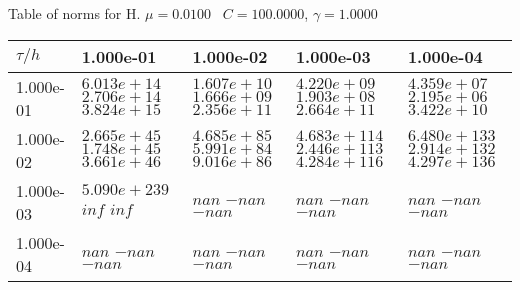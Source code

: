 \begin{center}
Table of norms for H. $\mu = 0.0100$ \, $C = 100.0000$, $\gamma = 1.0000$
  
\begin{tabular}{|p{1in}|p{1in}|p{1in}|p{1in}|p{1in}|} \hline
$\tau / h$ &1.000e-01 &1.000e-02 &1.000e-03 &1.000e-04 \\ \hline 
1.000e-01 & $6.013e+14$  $2.706e+14$  $3.824e+15$  & $1.607e+10$  $1.666e+09$  $2.356e+11$  & $4.220e+09$  $1.903e+08$  $2.664e+11$  & $4.359e+07$  $2.195e+06$  $3.422e+10$  \\ \hline 
1.000e-02 & $2.665e+45$  $1.748e+45$  $3.661e+46$  & $4.685e+85$  $5.991e+84$  $9.016e+86$  & $4.683e+114$  $2.446e+113$  $4.284e+116$  & $6.480e+133$  $2.914e+132$  $4.297e+136$  \\ \hline 
1.000e-03 & $5.090e+239$  $inf$  $inf$  & $nan$  $-nan$  $-nan$  & $nan$  $-nan$  $-nan$  & $nan$  $-nan$  $-nan$  \\ \hline 
1.000e-04 & $nan$  $-nan$  $-nan$  & $nan$  $-nan$  $-nan$  & $nan$  $-nan$  $-nan$  & $nan$  $-nan$  $-nan$  \\ \hline 

\end{tabular}\\[20pt]
\end{center}
